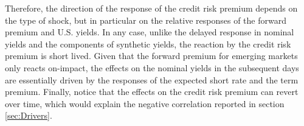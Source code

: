 {Therefore, the direction of the response of the credit risk premium  depends on the type of shock, but in particular on the relative responses of the forward premium and U.S. yields.
In any case, unlike the delayed response in nominal yields and the components of synthetic yields, the reaction by the credit risk premium is short lived.
Given that the forward premium for emerging markets only reacts on-impact, the effects on the nominal yields in the subsequent days are essentially driven by the responses of the expected short rate and the term premium.
Finally, notice that the effects on the credit risk premium can revert over time, which would explain the negative correlation reported in section \ref{sec:Drivers}.







%	
%	
%	
%	

}{}	%


